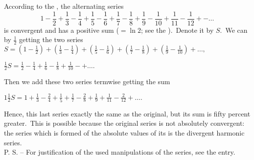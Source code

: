 \documentclass[12pt]{article}
\begin{document}
According to the , 
the alternating series
$$1-\frac{1}{2}+\frac{1}{3}-\frac{1}{4}+\frac{1}{5}-\frac{1}{6}+\frac{1}{7}
-\frac{1}{8}+\frac{1}{9}-\frac{1}{10}+\frac{1}{11}-\frac{1}{12}+-\ldots$$
is convergent and has a positive sum ($= \ln{2}$; see the ).\, Denote it by $S$.\, We can  by $\frac{1}{2}$ getting the two series
$S = (1-\frac{1}{2})+(\frac{1}{3}-\frac{1}{4})+(\frac{1}{5}-\frac{1}{6})+(\frac{1}{7}
-\frac{1}{8})+(\frac{1}{9}-\frac{1}{10})+\ldots,$

$\frac{1}{2}S = \frac{1}{2}-\frac{1}{4}+\frac{1}{6}-\frac{1}{8}+\frac{1}{10}-+\ldots.$

Then we add these two series termwise getting the sum

$1\frac{1}{2}S = 1+\frac{1}{3}-\frac{2}{4}+\frac{1}{5}+\frac{1}{7}
-\frac{2}{8}+\frac{1}{9}+\frac{1}{11}-\frac{2}{12}+\ldots.$

Hence, this last series  exactly the same  as the original, but its sum is fifty percent greater.\, This is possible because the original series is not absolutely convergent:\, the series which is formed of the absolute values of its  is the divergent harmonic series.\\

P. S.\; -- For justification of the used manipulations of the series, see the  entry.
\end{document}
